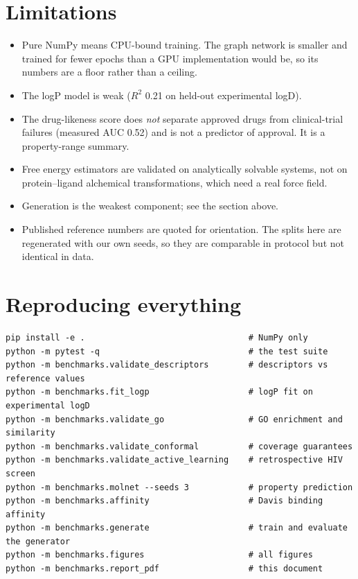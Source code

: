 \documentclass[11pt]{article}
\begin{document}
\section{Limitations}

\begin{itemize}
\item Pure NumPy means CPU-bound training. The graph network is smaller and trained for
fewer epochs than a GPU implementation would be, so its numbers are a floor rather than a
ceiling.
\item The logP model is weak ($R^2$ 0.21 on
held-out experimental logD).
\item The drug-likeness score does \emph{not} separate approved drugs from clinical-trial
failures (measured AUC 0.52) and is not a predictor of approval. It is a property-range
summary.
\item Free energy estimators are validated on analytically solvable systems, not on
protein--ligand alchemical transformations, which need a real force field.
\item Generation is the weakest component; see the section above.
\item Published reference numbers are quoted for orientation. The splits here are
regenerated with our own seeds, so they are comparable in protocol but not identical in
data.
\end{itemize}

\section{Reproducing everything}

\begin{verbatim}
pip install -e .                                 # NumPy only
python -m pytest -q                              # the test suite
python -m benchmarks.validate_descriptors        # descriptors vs reference values
python -m benchmarks.fit_logp                    # logP fit on experimental logD
python -m benchmarks.validate_go                 # GO enrichment and similarity
python -m benchmarks.validate_conformal          # coverage guarantees
python -m benchmarks.validate_active_learning    # retrospective HIV screen
python -m benchmarks.molnet --seeds 3            # property prediction
python -m benchmarks.affinity                    # Davis binding affinity
python -m benchmarks.generate                    # train and evaluate the generator
python -m benchmarks.figures                     # all figures
python -m benchmarks.report_pdf                  # this document
\end{verbatim}
\end{document}
